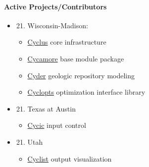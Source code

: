 \documentclass[letterpaper,10pt,english]{sphinxmanual}
\begin{document}
\paragraph{Active Projects/Contributors}
\label{basics/roadmap:active-projects-contributors}\begin{itemize}
\item {} \begin{enumerate}
\setcounter{enumi}{20}
\item {} 
Wisconsin-Madison:

\end{enumerate}
\begin{itemize}
\item {} 
\href{http://github.com/cyclus/cyclus}{Cyclus} core infrastructure

\item {} 
\href{http://github.com/cyclus/cycamore}{Cycamore} base module package

\item {} 
\href{http://github.com/katyhuff/cyder}{Cyder} geologic repository modeling

\item {} 
\href{http://github.com/cyclus/cyclopts}{Cyclopts} optimization interface library

\end{itemize}

\item {} \begin{enumerate}
\setcounter{enumi}{20}
\item {} 
Texas at Austin

\end{enumerate}
\begin{itemize}
\item {} 
\href{http://github.com/cyclus/cycic}{Cycic} input control

\end{itemize}

\item {} \begin{enumerate}
\setcounter{enumi}{20}
\item {} 
Utah

\end{enumerate}
\begin{itemize}
\item {} 
\href{http://github.com/cyclus/cyclist}{Cyclist} output visualization

\end{itemize}

\end{itemize}
\end{document}
